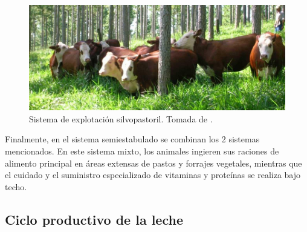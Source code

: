 \begin{figure}[H]
 \begin{center}
 \includegraphics[scale=0.74]{img/silvopastoril.png}
 \end{center}
 \caption{Sistema de explotación silvopastoril. Tomada de \cite{contextoganadero}. \label{silvopng}}
\end{figure}

Finalmente, en el sistema semiestabulado se combinan los 2 sistemas mencionados. En este sistema mixto, los animales ingieren sus raciones de alimento principal en áreas extensas de pastos y forrajes vegetales, mientras que el cuidado y el suministro especializado de vitaminas y proteínas se realiza bajo techo.
\subsection{Ciclo productivo de la leche}


